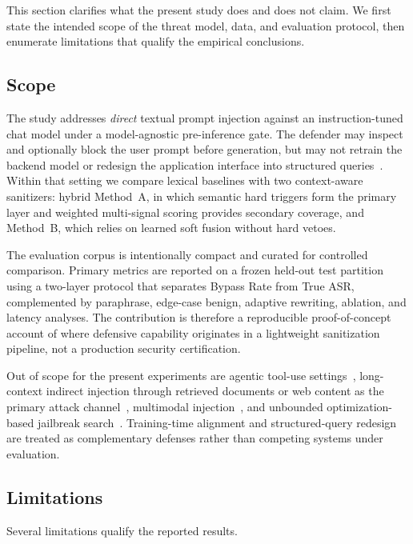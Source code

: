 \documentclass{article}
\begin{document}
This section clarifies what the present study does and does not claim.
We first state the intended scope of the threat model, data, and evaluation protocol, then enumerate limitations that qualify the empirical conclusions.

\subsection{Scope}
\label{sec:scope}

The study addresses \emph{direct} textual prompt injection against an instruction-tuned chat model under a model-agnostic pre-inference gate.
The defender may inspect and optionally block the user prompt before generation, but may not retrain the backend model or redesign the application interface into structured queries~\cite{struq2024,secalign2024}.
Within that setting we compare lexical baselines with two context-aware sanitizers: hybrid Method~A, in which semantic hard triggers form the primary layer and weighted multi-signal scoring provides secondary coverage, and Method~B, which relies on learned soft fusion without hard vetoes.

The evaluation corpus is intentionally compact and curated for controlled comparison.
Primary metrics are reported on a frozen held-out test partition using a two-layer protocol that separates Bypass Rate from True ASR, complemented by paraphrase, edge-case benign, adaptive rewriting, ablation, and latency analyses.
The contribution is therefore a reproducible proof-of-concept account of where defensive capability originates in a lightweight sanitization pipeline, not a production security certification.

Out of scope for the present experiments are agentic tool-use settings~\cite{debenedetti2024agentdojo}, long-context indirect injection through retrieved documents or web content as the primary attack channel~\cite{greshake2023indirect,hines2024spotlighting}, multimodal injection~\cite{yeo2025multimodal}, and unbounded optimization-based jailbreak search~\cite{yi2024jailbreak}.
Training-time alignment and structured-query redesign are treated as complementary defenses rather than competing systems under evaluation.

\subsection{Limitations}
\label{sec:limitations-detail}

Several limitations qualify the reported results.
\end{document}
